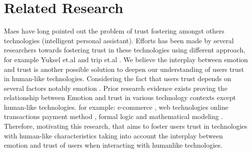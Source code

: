 \section{Related Research}
Maes \cite{maes1995agents:fourtytwo} have long pointed out the problem of trust fostering amongst others technologies (intelligent personal assistant). Efforts has been made by several researchers towards fostering trust in these technologies using different approach, for example Yuksel et.al \cite{yuksel2017brains:fourtythree} and  trip et.al \cite{tripp2011degrees:four}. We believe the interplay between emotion and trust is another possible solution to deepen our understanding of users trust in human-like technologies. Considering the fact that users trust depends on several factors notably emotion \cite{jones1998experience:fourtyfour}. Prior research evidence exists proving the relationship between Emotion and trust in various technology contexts except human-like technologies. for example: e-commerce \cite{pelet2013chromatic:twentyseven}, web technologies \cite{kang2012effect:twentyeight} online transactions payment method \cite{tislar2014emotions:twentynine}, formal logic and mathematical modeling \cite{bonnefon2009relation:thirty}. 
Therefore, motivating this research, that aims to foster users trust in technologies with human-like characteristics taking into account the interplay between emotion and trust of users when interacting with humanlike technologies.

